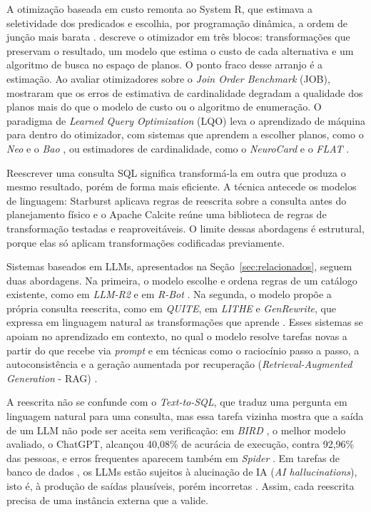 \documentclass[12pt]{article}
\begin{document}
A otimização baseada em custo remonta ao System R, que estimava a seletividade dos predicados e escolhia, por programação dinâmica, a ordem de junção mais barata \cite{selinger1979}. \textcite{chaudhuri1998} descreve o otimizador em três blocos: transformações que preservam o resultado, um modelo que estima o custo de cada alternativa e um algoritmo de busca no espaço de planos. O ponto fraco desse arranjo é a estimação. Ao avaliar otimizadores sobre o \textit{Join Order Benchmark} (JOB), \textcite{leis2015job} mostraram que os erros de estimativa de cardinalidade degradam a qualidade dos planos mais do que o modelo de custo ou o algoritmo de enumeração. O paradigma de \textit{Learned Query Optimization} (LQO) leva o aprendizado de máquina para dentro do otimizador, com sistemas que aprendem a escolher planos, como o \textit{Neo} e o \textit{Bao} \cite{marcus2019neo,marcus2021bao}, ou estimadores de cardinalidade, como o \textit{NeuroCard} e o \textit{FLAT} \cite{yang2021neurocard,zhu2021flat}.

Reescrever uma consulta SQL significa transformá-la em outra que produza o mesmo resultado, porém de forma mais eficiente. A técnica antecede os modelos de linguagem: Starburst \cite{pirahesh1992starburst} aplicava regras de reescrita sobre a consulta antes do planejamento físico e o Apache Calcite \cite{begoli2018calcite} reúne uma biblioteca de regras de transformação testadas e reaproveitáveis. O limite dessas abordagens é estrutural, porque elas só aplicam transformações codificadas previamente.

Sistemas baseados em LLMs, apresentados na Seção~\ref{sec:relacionados}, seguem duas abordagens. Na primeira, o modelo escolhe e ordena regras de um catálogo existente, como em \textit{LLM-R2} e em \textit{R-Bot} \cite{li2024llmr2,sun2025rbot}. Na segunda, o modelo propõe a própria consulta reescrita, como em \textit{QUITE}, em \textit{LITHE} e \textit{GenRewrite}, que expressa em linguagem natural as transformações que aprende \cite{song2025quite,dharwada2026lithe,liu2025genrewrite}. Esses sistemas se apoiam no aprendizado em contexto, no qual o modelo resolve tarefas novas a partir do que recebe via \textit{prompt} \cite{brown2020fewshot} e em técnicas como o raciocínio passo a passo, a autoconsistência \cite{wei2022cot,wang2023selfconsistency} e a geração aumentada por recuperação (\textit{Retrieval-Augmented Generation} - RAG) \cite{lewis2020rag}.

A reescrita não se confunde com o \textit{Text-to-SQL}, que traduz uma pergunta em linguagem natural para uma consulta, mas essa tarefa vizinha mostra que a saída de um LLM não pode ser aceita sem verificação: em \textit{BIRD} \cite{li2023bird}, o melhor modelo avaliado, o ChatGPT, alcançou 40,08\% de acurácia de execução, contra 92,96\% das pessoas, e erros frequentes aparecem também em \textit{Spider} \cite{yu2018spider}. Em tarefas de banco de dados \cite{li2024llm4dm}, os LLMs estão sujeitos à alucinação de IA (\textit{AI hallucinations}), isto é, à produção de saídas plausíveis, porém incorretas \cite{huang2024hallucination}. Assim, cada reescrita precisa de uma instância externa que a valide.
\end{document}
